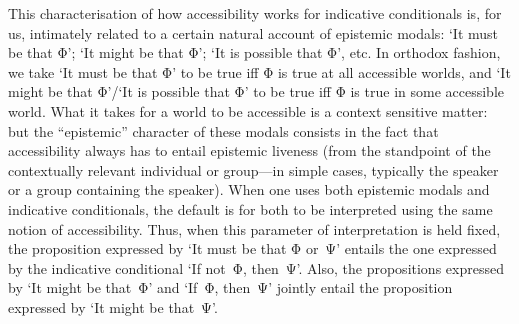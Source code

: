 \documentclass[If.tex]{subfiles}
\begin{document}
This characterisation of how accessibility works for indicative conditionals is, for us, intimately related to a certain natural account of epistemic modals: ‘It must be that Φ’; ‘It might be that Φ’; ‘It is possible that Φ’, etc. In orthodox fashion, we take ‘It must be that Φ’ to be true iff Φ is true at all accessible worlds, and ‘It might be that Φ’/‘It is possible that Φ’ to be true iff Φ is true in some accessible world. What it takes for a world to be accessible is a context sensitive matter: but the “epistemic” character of these modals consists in the fact that accessibility always has to entail epistemic liveness (from the standpoint of the contextually relevant individual or group---in simple cases, typically the speaker or a group containing the speaker). When one uses both epistemic modals and indicative conditionals, the default is for both to be interpreted using the same notion of accessibility. Thus, when this parameter of interpretation is held fixed, the proposition expressed by ‘It must be that Φ or~Ψ’ entails the one expressed by the indicative conditional ‘If not~Φ, then~Ψ’. Also, the propositions expressed by ‘It might be that~Φ’ and ‘If~Φ, then~Ψ’ jointly entail the proposition expressed by ‘It might be that~Ψ’.
\end{document}
